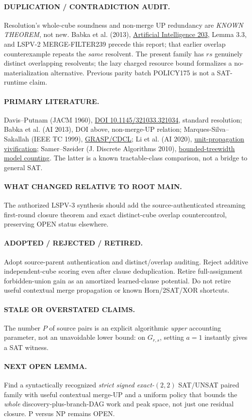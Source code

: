 \documentclass[11pt]{article}
\begin{document}
\paragraph{DUPLICATION / CONTRADICTION AUDIT.} Resolution's whole-cube soundness and non-merge UP redundancy are \emph{KNOWN THEOREM}, not new. Babka et al. (2013), \href{https://doi.org/10.1016/j.artint.2013.07.006}{Artificial Intelligence 203}, Lemma 3.3, and LSPV-2 MERGE-FILTER239 precede this report; that earlier overlap counterexample repeats the \emph{same} resolvent. The present family has $rs$ genuinely distinct overlapping resolvents; the lazy charged resource bound formalizes a no-materialization alternative. Previous parity batch POLICY175 is not a SAT-runtime claim.
\paragraph{PRIMARY LITERATURE.} Davis--Putnam (JACM 1960), \href{https://doi.org/10.1145/321033.321034}{DOI 10.1145/321033.321034}, standard resolution; Babka et al. (AI 2013), DOI above, non-merge-UP relation; Marques-Silva--Sakallah (IEEE TC 1999), \href{https://doi.org/10.1109/12.769433}{GRASP/CDCL}; Li et al. (AI 2020), \href{https://arxiv.org/abs/1807.11061}{unit-propagation vivification}; Samer--Szeider (J. Discrete Algorithms 2010), \href{https://doi.org/10.1016/j.jda.2009.06.002}{bounded-treewidth model counting}. The latter is a known tractable-class comparison, not a bridge to general SAT.
\paragraph{WHAT CHANGED RELATIVE TO ROOT MAIN.} The authorized LSPV-3 synthesis should add the source-authenticated streaming first-round closure theorem and exact distinct-cube overlap countercontrol, preserving OPEN status elsewhere.
\paragraph{ADOPTED / REJECTED / RETIRED.} Adopt source-parent authentication and distinct/overlap auditing. Reject additive independent-cube scoring even after clause deduplication. Retire full-assignment forbidden-union gain as an amortized learned-clause potential. Do not retire useful contextual merge propagation or known Horn/2SAT/XOR shortcuts.
\paragraph{STALE OR OVERSTATED CLAIMS.} The number $P$ of source pairs is an explicit algorithmic \emph{upper} accounting parameter, not an unavoidable lower bound: on $G_{r,s}$, setting $a=1$ instantly gives a SAT witness.
\paragraph{NEXT OPEN LEMMA.} Find a syntactically recognized \emph{strict signed exact-$(2,2)$} SAT/UNSAT paired family with useful contextual merge-UP and a uniform policy that bounds the \emph{whole} discovery-plus-branch-DAG work and peak space, not just one residual closure. P versus NP remains OPEN.
\end{document}
